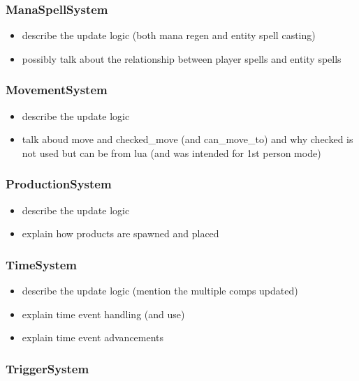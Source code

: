 \subsubsection{ManaSpellSystem}

\begin{itemize}
    \item describe the update logic (both mana regen and entity spell casting)
    \item possibly talk about the relationship between player spells and entity spells
\end{itemize}

\subsubsection{MovementSystem}

\begin{itemize}
    \item describe the update logic
    \item talk aboud move and checked\_move (and can\_move\_to) and why checked is not used
        but can be from lua (and was intended for 1st person mode)
\end{itemize}

\subsubsection{ProductionSystem}

\begin{itemize}
    \item describe the update logic
    \item explain how products are spawned and placed
\end{itemize}

\subsubsection{TimeSystem}

\begin{itemize}
    \item describe the update logic (mention the multiple comps updated)
    \item explain time event handling (and use)
    \item explain time event advancements
\end{itemize}

\subsubsection{TriggerSystem}


